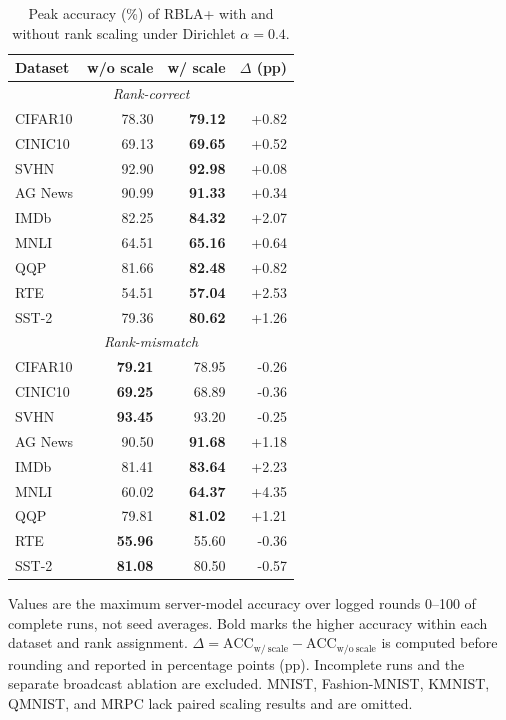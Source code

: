 \begin{table}[t]
  \centering
  \caption{Peak accuracy (\%) of RBLA+ with and without rank scaling under Dirichlet $\alpha=0.4$.}
  \label{tab:rbla-rank-scale-accuracy}
  \footnotesize
  \setlength{\tabcolsep}{3pt}
  \begin{tabular*}{\columnwidth}{@{\extracolsep{\fill}}lrrr@{}}
    \toprule
    Dataset & w/o scale & w/ scale & $\Delta$ (pp) \\
    \midrule
    \multicolumn{4}{c}{\textit{Rank-correct}} \\
    \midrule
    CIFAR10 & 78.30 & \textbf{79.12} & +0.82 \\
    CINIC10 & 69.13 & \textbf{69.65} & +0.52 \\
    SVHN & 92.90 & \textbf{92.98} & +0.08 \\
    AG News & 90.99 & \textbf{91.33} & +0.34 \\
    IMDb & 82.25 & \textbf{84.32} & +2.07 \\
    MNLI & 64.51 & \textbf{65.16} & +0.64 \\
    QQP & 81.66 & \textbf{82.48} & +0.82 \\
    RTE & 54.51 & \textbf{57.04} & +2.53 \\
    SST-2 & 79.36 & \textbf{80.62} & +1.26 \\
    \midrule
    \multicolumn{4}{c}{\textit{Rank-mismatch}} \\
    \midrule
    CIFAR10 & \textbf{79.21} & 78.95 & -0.26 \\
    CINIC10 & \textbf{69.25} & 68.89 & -0.36 \\
    SVHN & \textbf{93.45} & 93.20 & -0.25 \\
    AG News & 90.50 & \textbf{91.68} & +1.18 \\
    IMDb & 81.41 & \textbf{83.64} & +2.23 \\
    MNLI & 60.02 & \textbf{64.37} & +4.35 \\
    QQP & 79.81 & \textbf{81.02} & +1.21 \\
    RTE & \textbf{55.96} & 55.60 & -0.36 \\
    SST-2 & \textbf{81.08} & 80.50 & -0.57 \\
    \bottomrule
  \end{tabular*}
  \par\smallskip
  \parbox{\columnwidth}{\scriptsize
  Values are the maximum server-model accuracy over logged rounds 0--100 of complete runs, not seed averages. Bold marks the higher accuracy within each dataset and rank assignment. $\Delta=\mathrm{ACC}_{\mathrm{w/\ scale}}-\mathrm{ACC}_{\mathrm{w/o\ scale}}$ is computed before rounding and reported in percentage points (pp). Incomplete runs and the separate broadcast ablation are excluded. MNIST, Fashion-MNIST, KMNIST, QMNIST, and MRPC lack paired scaling results and are omitted.}
\end{table}
